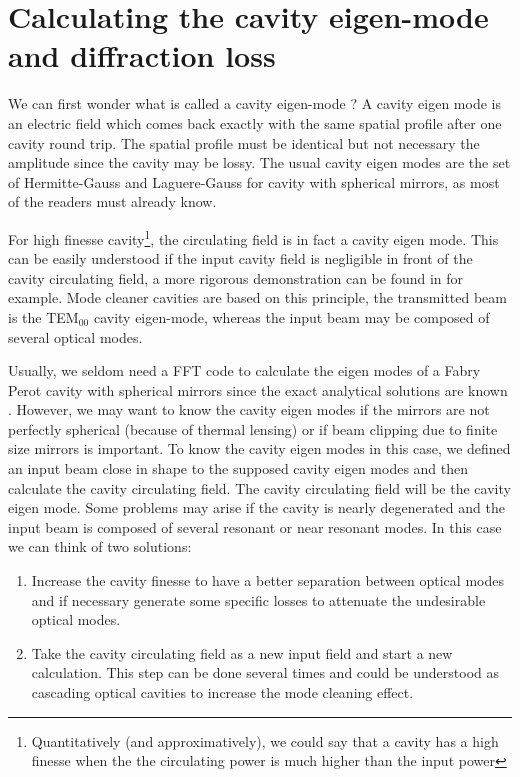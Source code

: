 \section{Calculating the cavity eigen-mode and diffraction loss}
\label{sec2:6}
We can first wonder what is called a cavity eigen-mode ? A cavity eigen mode is an electric field which comes back exactly with the same spatial profile after one cavity round trip. The spatial profile must be identical but not necessary the amplitude since the cavity may be lossy. The usual cavity eigen modes are the set of Hermitte-Gauss and Laguere-Gauss for cavity with spherical mirrors, as most of the readers must already know.

For high finesse cavity\footnote{Quantitatively (and approximatively), we could say that a cavity has a high finesse when the the circulating power is much higher than the input power}, the circulating field is in fact a cavity eigen mode. This can be easily understood if the input cavity field is negligible in front of the cavity circulating field, a more rigorous demonstration can be found in \cite{Saha:97} for example. Mode cleaner cavities are based on this principle, the transmitted beam is the TEM$_{00}$ cavity eigen-mode, whereas the input beam may be composed of several optical modes.

Usually, we seldom need a FFT code to calculate the eigen modes of a Fabry Perot cavity with spherical mirrors since the exact analytical solutions are known \cite{Koechner}. However, we may want to know the cavity eigen modes if the mirrors are not perfectly spherical (because of thermal lensing) or if beam clipping due to finite size mirrors is important. To know the cavity eigen modes in this case, we defined an input beam close in shape to the supposed cavity eigen modes and then calculate the cavity circulating field. The cavity circulating field will be the cavity eigen mode. Some problems may arise if the cavity is nearly degenerated and the input beam is composed of several resonant or near resonant modes. In this case we can think of two solutions:
\begin{enumerate}
  \item Increase the cavity finesse to have a better separation between optical modes and if necessary generate some specific losses to attenuate the undesirable optical modes.
  \item Take the cavity circulating field as a new input field and start a new calculation. This step can be done several times and could be understood as cascading optical cavities to increase the mode cleaning effect.
\end{enumerate}

